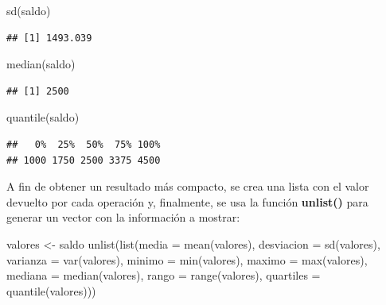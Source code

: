 \documentclass[
  12pt,
]{book}
\newenvironment{Shaded}{\begin{snugshade}}{\end{snugshade}}
\newcommand{\AttributeTok}[1]{\textcolor[rgb]{0.77,0.63,0.00}{#1}}
\newcommand{\FunctionTok}[1]{\textcolor[rgb]{0.00,0.00,0.00}{#1}}
\newcommand{\NormalTok}[1]{#1}
\newcommand{\OtherTok}[1]{\textcolor[rgb]{0.56,0.35,0.01}{#1}}
\begin{document}
\begin{Shaded}
\begin{Highlighting}[]
\FunctionTok{sd}\NormalTok{(saldo)}
\end{Highlighting}
\end{Shaded}

\begin{verbatim}
## [1] 1493.039
\end{verbatim}

\begin{Shaded}
\begin{Highlighting}[]
\FunctionTok{median}\NormalTok{(saldo)}
\end{Highlighting}
\end{Shaded}

\begin{verbatim}
## [1] 2500
\end{verbatim}

\begin{Shaded}
\begin{Highlighting}[]
\FunctionTok{quantile}\NormalTok{(saldo)}
\end{Highlighting}
\end{Shaded}

\begin{verbatim}
##   0%  25%  50%  75% 100% 
## 1000 1750 2500 3375 4500
\end{verbatim}

A fin de obtener un resultado más compacto,
se crea una lista con el valor devuelto por cada operación y, finalmente, se usa la
función \textbf{unlist()} para generar un vector con la información a mostrar:

\begin{Shaded}
\begin{Highlighting}[]
\NormalTok{valores }\OtherTok{\textless{}{-}}\NormalTok{ saldo}
\FunctionTok{unlist}\NormalTok{(}\FunctionTok{list}\NormalTok{(}\AttributeTok{media =} \FunctionTok{mean}\NormalTok{(valores), }\AttributeTok{desviacion =} \FunctionTok{sd}\NormalTok{(valores), }\AttributeTok{varianza =} \FunctionTok{var}\NormalTok{(valores), }\AttributeTok{minimo =} \FunctionTok{min}\NormalTok{(valores), }\AttributeTok{maximo =} \FunctionTok{max}\NormalTok{(valores), }\AttributeTok{mediana =} \FunctionTok{median}\NormalTok{(valores), }\AttributeTok{rango =} \FunctionTok{range}\NormalTok{(valores), }\AttributeTok{quartiles =} \FunctionTok{quantile}\NormalTok{(valores)))}
\end{Highlighting}
\end{Shaded}
\end{document}
